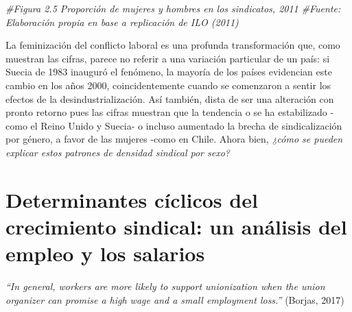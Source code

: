 \documentclass[
]{book}
\newenvironment{Shaded}{\begin{snugshade}}{\end{snugshade}}
\newcommand{\CommentTok}[1]{\textcolor[rgb]{0.56,0.35,0.01}{\textit{#1}}}
\begin{document}
\begin{Shaded}
\begin{Highlighting}[]
\CommentTok{#Figura 2.5 Proporción de mujeres y hombres en los sindicatos, 2011}
\CommentTok{#Fuente: Elaboración propia en base a replicación de ILO (2011)}
\end{Highlighting}
\end{Shaded}

La feminización del conflicto laboral es una profunda transformación que, como muestran las cifras, parece no referir a una variación particular de un país: si Suecia de 1983 inauguró el fenómeno, la mayoría de los países evidencian este cambio en los años 2000, coincidentemente cuando se comenzaron a sentir los efectos de la desindustrialización. Así también, dista de ser una alteración con pronto retorno pues las cifras muestran que la tendencia o se ha estabilizado -como el Reino Unido y Suecia- o incluso aumentado la brecha de sindicalización por género, a favor de las mujeres -como en Chile. Ahora bien, \emph{¿cómo se pueden explicar estos patrones de densidad sindical por sexo?}

\hypertarget{determinantes-cuxedclicos-del-crecimiento-sindical-un-anuxe1lisis-del-empleo-y-los-salarios}{%
\section{Determinantes cíclicos del crecimiento sindical: un análisis del empleo y los salarios}\label{determinantes-cuxedclicos-del-crecimiento-sindical-un-anuxe1lisis-del-empleo-y-los-salarios}}

\emph{``In general, workers are more likely to support unionization when the union organizer can promise a high wage and a small employment loss.''} (Borjas, 2017)
\end{document}
